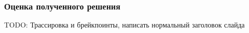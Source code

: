 \begin{frame}
\frametitle{Оценка полученного решения}
TODO: Трассировка и брейкпоинты, написать нормальный заголовок слайда
\end{frame}
